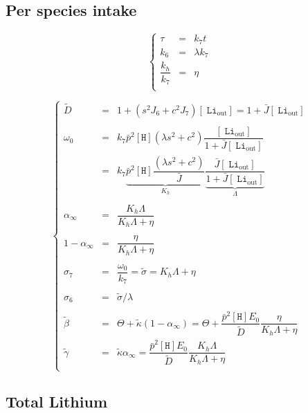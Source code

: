 \documentclass[aps,onecolumn,12pt]{revtex4}
\newcommand{\mychem}[1]{\mathtt{#1}}
\newcommand{\myconc}[1]{\left\lbrack{#1}\right\rbrack}
\newcommand{\spLi}[1]{{~^{\mychem{#1}}\mychem{Li}}}
\newcommand{\spLiOut}[1]{{\spLi{#1}}_{\mathrm{out}}}
\newcommand{\LiOut}[1]{\myconc{\spLiOut{#1}}}
\newcommand{\spproton}{\mychem{H}}
\newcommand{\proton}{\myconc{\spproton}}
\begin{document}
\subsection{Per species intake}
\begin{equation}
\left\lbrace
	\begin{array}{rcl}
	\tau & = & k_7 t\\
	k_6  & = & \lambda k_7\\
	\dfrac{k_h}{k_7} & = & \eta \\
	\end{array}
\right.
\end{equation}

\begin{equation}
\left\lbrace
	\begin{array}{rcl}
	\tilde{D} & = & 1 + \left(s^2J_6+c^2J_7\right) \LiOut{} = 1+\bar{J} \LiOut{}\\
	\\
	\omega_0  & = & k_7 \bar{p}^2 \proton \left(\lambda s^2+c^2\right) \dfrac{ \LiOut{} }{1+\bar{J}\LiOut{}} \\
	& = & k_7 \underbrace{\bar{p}^2 \proton \dfrac{\left(\lambda s^2+c^2\right)}{\bar{J}}}_{K_h}
	\underbrace{ \dfrac{ \bar{J} \LiOut{} }{1+\bar{J}\LiOut{}}}_{\Lambda}\\
	\\
	\alpha_\infty & = & \dfrac{K_h\Lambda}{K_h\Lambda+\eta}\\
	\\
	1-\alpha_\infty & = & \dfrac{\eta}{K_h\Lambda+\eta}\\
	\\
	\sigma_7 & = & \dfrac{\omega_0}{k_7} = \tilde\sigma = K_h\Lambda+\eta\\
	\\
	\sigma_6 & = & \tilde\sigma/\lambda\\
	\\
	\tilde\beta & = & \Theta + \tilde\kappa\left(1-\alpha_\infty\right) = \Theta+\dfrac{\bar{p}^2 \proton E_0}{\tilde{D}}  \dfrac{\eta}{K_h\Lambda+\eta}\\
	\tilde\gamma & = & \tilde\kappa \alpha_\infty = \dfrac{\bar{p}^2 \proton E_0}{\tilde{D}}\dfrac{K_h\Lambda}{K_h\Lambda+\eta}\\
	\end{array}
\right.
\end{equation}

\subsection{Total Lithium}
\end{document}
